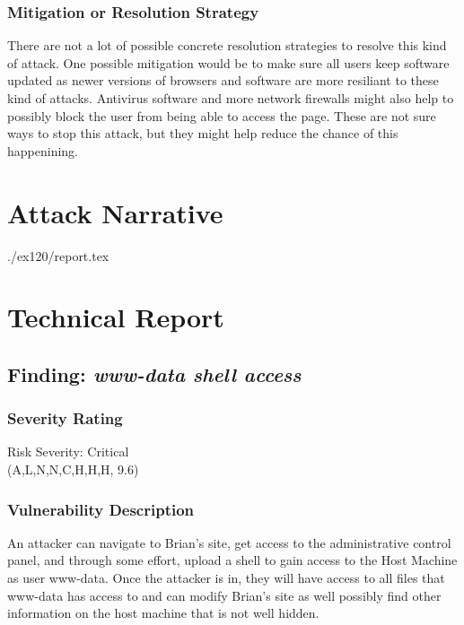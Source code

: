     \subsubsection*{Mitigation or Resolution Strategy}
    There are not a lot of possible concrete resolution strategies to resolve this kind of attack. One possible mitigation would be to make sure all users keep software updated as 
    newer versions of browsers and software are more resiliant to these kind of attacks. Antivirus software and more network firewalls might also help to possibly block the user
    from being able to access the page. These are not sure ways to stop this attack, but they might help reduce the chance of this happenining.



\section{Attack Narrative}
./ex120/report.tex

\section{Technical Report}


  \subsection{Finding: \emph{www-data shell access}}
  

	\subsubsection*{Severity Rating}
	    Risk Severity: Critical \\
		\cvss(A,L,N,N,C,H,H,H, 9.6)
		
  	\subsubsection*{Vulnerability Description}
        An attacker can navigate to Brian's site, get access to the administrative control panel, and through some effort, upload a shell to gain access
        to the Host Machine as user www-data. Once the attacker is in, they will have access to all files that www-data has access to and can modify
        Brian's site as well possibly find other information on the host machine that is not well hidden.

